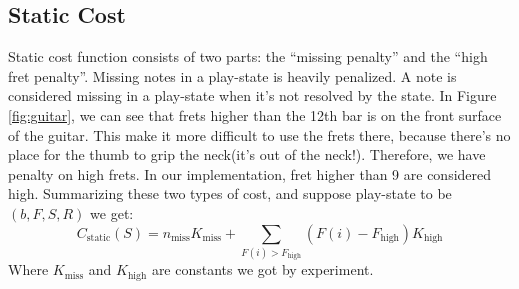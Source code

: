 \subsection{Static Cost}
Static cost function consists of two parts: the ``missing penalty'' and the ``high fret penalty''. Missing notes in a play-state is heavily penalized. A note is considered missing in a play-state when it's not resolved by the state. In Figure \ref{fig:guitar}, we can see that frets higher than the 12th bar is on the front surface of the guitar. This make it more difficult to use the frets there, because there's no place for the thumb to grip the neck(it's out of the neck!). Therefore, we have penalty on high frets. In our implementation, fret higher than 9 are considered high. Summarizing these two types of cost, and suppose play-state to be $(b, F, S, R)$  we get:
    \[
    C_{\mathrm{static}}(S) = n_{\mathrm{miss}} K_{\mathrm{miss}} 
        + \sum_{F(i) > F_{\mathrm{high}}} (F(i) - F_{\mathrm{high}}) K_{\mathrm{high}}
    \]
Where $K_{\mathrm{miss}}$ and $K_{\mathrm{high}}$ are constants we got by experiment. 


